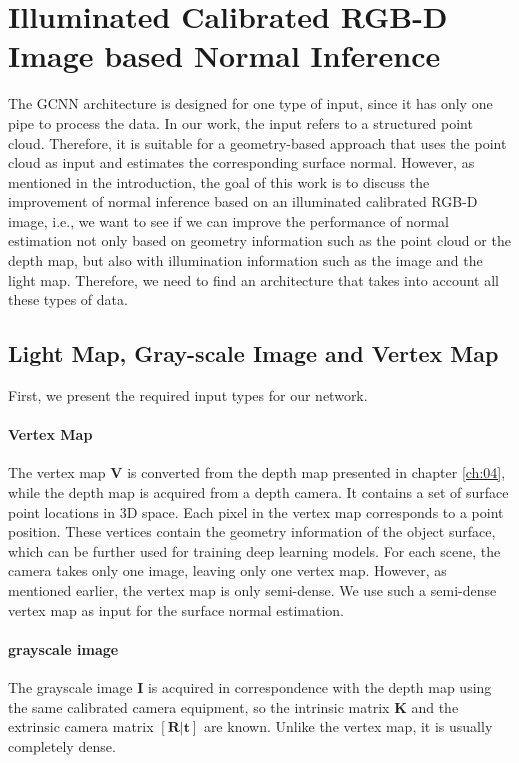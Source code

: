 \section{Illuminated Calibrated RGB-D Image based Normal Inference}
\label{sec:trip-net}
The GCNN architecture is designed for one type of input, since it has only one pipe to process the data. In our work, the input refers to a structured point cloud. Therefore, it is suitable for a geometry-based approach that uses the point cloud as input and estimates the corresponding surface normal. However, as mentioned in the introduction, the goal of this work is to discuss the improvement of normal inference based on an illuminated calibrated RGB-D image, i.e., we want to see if we can improve the performance of normal estimation not only based on geometry information such as the point cloud or the depth map, but also with illumination information such as the image and the light map. Therefore, we need to find an architecture that takes into account all these types of data. 


\subsection{Light Map, Gray-scale Image and Vertex Map}
\label{sec:lightmap}
First, we present the required input types for our network.

\paragraph{Vertex Map}
The vertex map $ \textbf{V} $ is converted from the depth map presented in chapter \ref{ch:04}, while the depth map is acquired from a depth camera. It contains a set of surface point locations in 3D space. Each pixel in the vertex map corresponds to a point position. These vertices contain the geometry information of the object surface, which can be further used for training deep learning models. For each scene, the camera takes only one image, leaving only one vertex map. However, as mentioned earlier, the vertex map is only semi-dense. We use such a semi-dense vertex map as input for the surface normal estimation.

\paragraph{grayscale image}
The grayscale image $ \textbf{I} $ is acquired in correspondence with the depth map using the same calibrated camera equipment, so the intrinsic matrix $ \textbf{K} $ and the extrinsic camera matrix $ [\textbf{R}|\textbf{t}] $ are known. Unlike the vertex map, it is usually completely dense.

